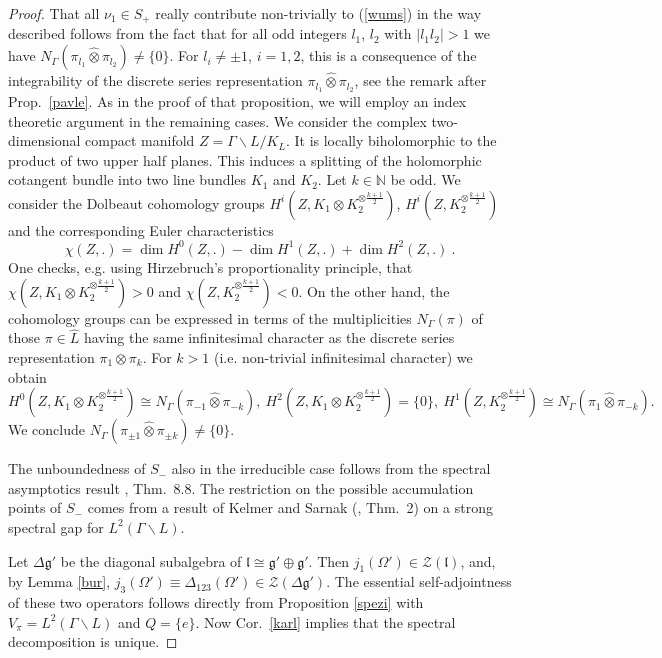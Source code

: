 \documentclass[10]{amsart}
\theoremstyle{remark}
\theoremstyle{definition}
\numberwithin{equation}{section}
\newcommand{\N}{\mathbb{N}}           %
\newcommand{\fg}{{\mathfrak g}}
\newcommand{\fl}{{\mathfrak l}}
\newcommand{\Cal}{\mathcal}
\begin{document}
{\begin{proof}
That all $\nu_1\in S_+$ really contribute non-trivially to (\ref{wums}) in the way described follows from the fact that for all odd integers $l_1$, $l_2$ with $|l_1l_2|>1$ we have $N_\Gamma(\pi_{l_1}\hat\otimes\pi_{l_2})\ne\{0\}$. For $l_i\ne \pm 1$, $i=1,2$, this is a consequence of the integrability of the discrete series representation $\pi_{l_1}\hat\otimes\pi_{l_2}$, see the remark after Prop.~\ref{pavle}. As in the proof of that proposition, we will employ an index theoretic argument in the remaining cases. 
We consider the complex two-dimensional compact manifold $Z=\Gamma\backslash L/K_L$. It  is locally biholomorphic to the product of two upper half planes. This induces
a splitting of the holomorphic cotangent bundle into two line bundles $K_1$ and $K_2$. Let $k\in\N$ be odd. We consider the Dolbeaut cohomology groups $H^i(Z,K_1\otimes K_2^{\otimes\frac{k+1}{2}})$, $H^i(Z, K_2^{\otimes\frac{k+1}{2}})$ and the corresponding Euler characteristics
$$ \chi(Z,.)=\dim H^0(Z,.)-\dim H^1(Z,.)+\dim H^2(Z,.)\ .$$
One checks, e.g. using Hirzebruch's proportionality principle, that $\chi(Z,K_1\otimes K_2^{\otimes\frac{k+1}{2}})>0$ and $\chi(Z,K_2^{\otimes\frac{k+1}{2}})<0$. On the other hand, the cohomology groups can be expressed in terms of the
multiplicities $N_\Gamma(\pi)$ of those $\pi\in \widehat L$ having the same infinitesimal character as the discrete series representation $\pi_1\hat\otimes\pi_k$. For $k>1$ (i.e. non-trivial infinitesimal character) we obtain 
$$H^0(Z,K_1\otimes K_2^{\otimes\frac{k+1}{2}})\cong N_\Gamma(\pi_{-1}\hat\otimes\pi_{-k}),\  H^2(Z,K_1\otimes K_2^{\otimes\frac{k+1}{2}})=\{0\}, \   H^1(Z, K_2^{\otimes\frac{k+1}{2}})\cong N_\Gamma(\pi_{1}\hat\otimes\pi_{-k}).$$
We conclude $N_\Gamma(\pi_{\pm 1}\hat\otimes\pi_{\pm k})\ne\{0\}$.

The unboundedness of $S_-$ also in the irreducible case follows from the spectral asymptotics result \cite{DKV79}, Thm.~8.8. The restriction on the possible accumulation points of $S_-$
comes from a result of Kelmer and Sarnak (\cite{KSa09}, Thm.~2) on a strong spectral gap for $L^2(\Gamma\backslash L)$.

Let $\Delta\fg'$ be the diagonal subalgebra of $\fl\cong \fg'\oplus\fg'$. Then $j_1(\Omega')\in {\Cal Z}(\fl)$, and, by Lemma \ref{bur}, $j_3(\Omega')\equiv \Delta_{123}(\Omega')\in {\Cal Z}(\Delta\fg')$.
The essential self-adjointness of these two operators follows directly from Proposition \ref{spezi} with $V_\pi=L^2(\Gamma\backslash L)$ and $Q=\{e\}$. Now Cor.~\ref{karl}
implies that the spectral decomposition is unique.


\end{proof}}
\end{document}
